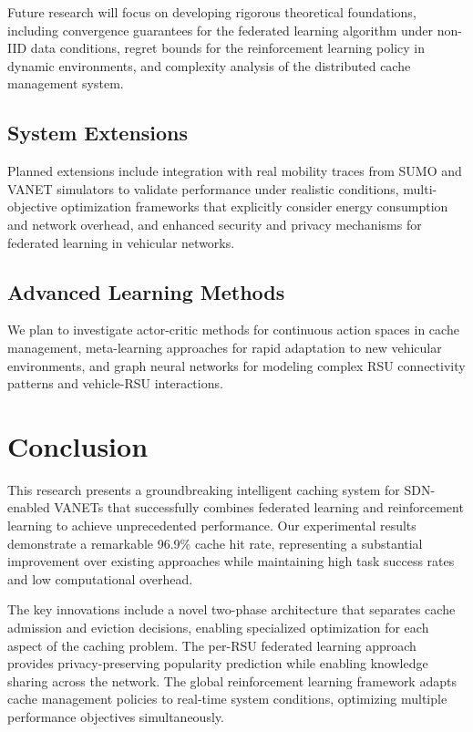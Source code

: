 \documentclass[11pt]{article}
\begin{document}
Future research will focus on developing rigorous theoretical foundations, including convergence guarantees for the federated learning algorithm under non-IID data conditions, regret bounds for the reinforcement learning policy in dynamic environments, and complexity analysis of the distributed cache management system.

\subsection{System Extensions}

Planned extensions include integration with real mobility traces from SUMO and VANET simulators to validate performance under realistic conditions, multi-objective optimization frameworks that explicitly consider energy consumption and network overhead, and enhanced security and privacy mechanisms for federated learning in vehicular networks.

\subsection{Advanced Learning Methods}

We plan to investigate actor-critic methods for continuous action spaces in cache management, meta-learning approaches for rapid adaptation to new vehicular environments, and graph neural networks for modeling complex RSU connectivity patterns and vehicle-RSU interactions.

\section{Conclusion}

This research presents a groundbreaking intelligent caching system for SDN-enabled VANETs that successfully combines federated learning and reinforcement learning to achieve unprecedented performance. Our experimental results demonstrate a remarkable 96.9\% cache hit rate, representing a substantial improvement over existing approaches while maintaining high task success rates and low computational overhead.

The key innovations include a novel two-phase architecture that separates cache admission and eviction decisions, enabling specialized optimization for each aspect of the caching problem. The per-RSU federated learning approach provides privacy-preserving popularity prediction while enabling knowledge sharing across the network. The global reinforcement learning framework adapts cache management policies to real-time system conditions, optimizing multiple performance objectives simultaneously.
\end{document}
